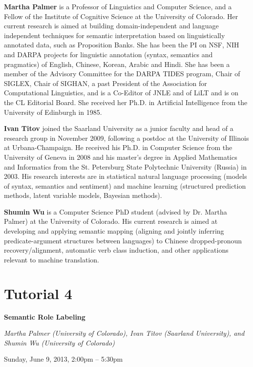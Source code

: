 \begin{bio}
\noindent
{\bfseries Martha Palmer} is a Professor of Linguistics and Computer Science, and a Fellow of the Institute of Cognitive Science at the University of Colorado. Her current research is aimed at building domain-independent and language independent techniques for semantic interpretation based on linguistically annotated data, such as Proposition Banks. She has been the PI on NSF, NIH and DARPA projects for linguistic annotation (syntax, semantics and pragmatics) of English, Chinese, Korean, Arabic and Hindi. She has been a member of the Advisory Committee for the DARPA TIDES program, Chair of SIGLEX, Chair of SIGHAN, a past President of the Association for Computational Linguistics, and is a Co-Editor of JNLE and of LiLT and is on the CL Editorial Board. She received her Ph.D. in Artificial Intelligence from the University of Edinburgh in 1985.

\noindent
{\bfseries Ivan Titov} joined the Saarland University as a junior faculty and head of a research group in November 2009, following a postdoc at the University of Illinois at Urbana-Champaign. He received his Ph.D. in Computer Science from the University of Geneva in 2008 and his master's degree in Applied Mathematics and Informatics from the St. Petersburg State Polytechnic University (Russia) in 2003. His research interests are in statistical natural language processing (models of syntax, semantics and sentiment) and machine learning (structured prediction methods, latent variable models, Bayesian methods).

\noindent
{\bfseries Shumin Wu} is a Computer Science PhD student (advised by Dr. Martha Palmer) at the University of Colorado. His current research is aimed at developing and applying semantic mapping (aligning and jointly inferring predicate-argument structures between languages) to Chinese dropped-pronoun recovery/alignment, automatic verb class induction, and other applications relevant to machine translation.
\end{bio}

\section%
    [\textbf{T4:} Semantic Role Labeling (M. Palmer, I. Titov and S. Wu)]
    {Tutorial 4}
\label{TutD}
\begin{center}
\begin{Large}
\bfseries Semantic Role Labeling\\ \vspace{2em}\par
\end{Large}

{\itshape Martha Palmer (University of Colorado), Ivan Titov (Saarland University), and Shumin Wu (University of Colorado)}\vspace{1em}\par
Sunday, June 9, 2013, 2:00pm -- 5:30pm \vspace{1em}\\
\TutLocD
\end{center}

